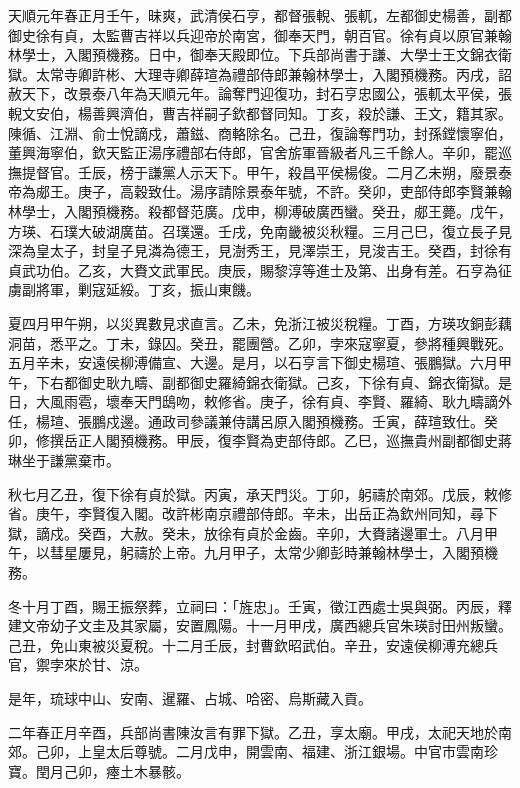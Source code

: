 
\begin{pinyinscope}
天順元年春正月壬午，昧爽，武清侯石亨，都督張輗、張軏，左都御史楊善，副都御史徐有貞，太監曹吉祥以兵迎帝於南宮，御奉天門，朝百官。徐有貞以原官兼翰林學士，入閣預機務。日中，御奉天殿即位。下兵部尚書于謙、大學士王文錦衣衛獄。太常寺卿許彬、大理寺卿薛瑄為禮部侍郎兼翰林學士，入閣預機務。丙戌，詔赦天下，改景泰八年為天順元年。論奪門迎復功，封石亨忠國公，張軏太平侯，張輗文安伯，楊善興濟伯，曹吉祥嗣子欽都督同知。丁亥，殺於謙、王文，籍其家。陳循、江淵、俞士悅謫戍，蕭鎡、商輅除名。己丑，復論奪門功，封孫鏜懷寧伯，董興海寧伯，欽天監正湯序禮部右侍郎，官舍旂軍晉級者凡三千餘人。辛卯，罷巡撫提督官。壬辰，榜于謙黨人示天下。甲午，殺昌平侯楊俊。二月乙未朔，廢景泰帝為郕王。庚子，高穀致仕。湯序請除景泰年號，不許。癸卯，吏部侍郎李賢兼翰林學士，入閣預機務。殺都督范廣。戊申，柳溥破廣西蠻。癸丑，郕王薨。戊午，方瑛、石璞大破湖廣苗。召璞還。壬戌，免南畿被災秋糧。三月己巳，復立長子見深為皇太子，封皇子見潾為德王，見澍秀王，見澤崇王，見浚吉王。癸酉，封徐有貞武功伯。乙亥，大賚文武軍民。庚辰，賜黎淳等進士及第、出身有差。石亨為征虜副將軍，剿寇延綏。丁亥，振山東饑。

夏四月甲午朔，以災異數見求直言。乙未，免浙江被災稅糧。丁酉，方瑛攻銅彭藕洞苗，悉平之。丁未，錄囚。癸丑，罷團營。乙卯，孛來寇寧夏，參將種興戰死。五月辛未，安遠侯柳溥備宣、大邊。是月，以石亨言下御史楊瑄、張鵬獄。六月甲午，下右都御史耿九疇、副都御史羅綺錦衣衛獄。己亥，下徐有貞、錦衣衛獄。是日，大風雨雹，壞奉天門鴟吻，敕修省。庚子，徐有貞、李賢、羅綺、耿九疇謫外任，楊瑄、張鵬戍邊。通政司參議兼侍講呂原入閣預機務。壬寅，薛瑄致仕。癸卯，修撰岳正人閣預機務。甲辰，復李賢為吏部侍郎。乙巳，巡撫貴州副都御史蔣琳坐于謙黨棄市。

秋七月乙丑，復下徐有貞於獄。丙寅，承天門災。丁卯，躬禱於南郊。戊辰，敕修省。庚午，李賢復入閣。改許彬南京禮部侍郎。辛未，出岳正為欽州同知，尋下獄，謫戍。癸酉，大赦。癸未，放徐有貞於金齒。辛卯，大賚諸邊軍士。八月甲午，以彗星屢見，躬禱於上帝。九月甲子，太常少卿彭時兼翰林學士，入閣預機務。

冬十月丁酉，賜王振祭葬，立祠曰：「旌忠」。壬寅，徵江西處士吳與弼。丙辰，釋建文帝幼子文圭及其家屬，安置鳳陽。十一月甲戌，廣西總兵官朱瑛討田州叛蠻。己丑，免山東被災夏稅。十二月壬辰，封曹欽昭武伯。辛丑，安遠侯柳溥充總兵官，禦孛來於甘、涼。

是年，琉球中山、安南、暹羅、占城、哈密、烏斯藏入貢。

二年春正月辛酉，兵部尚書陳汝言有罪下獄。乙丑，享太廟。甲戌，太祀天地於南郊。己卯，上皇太后尊號。二月戊申，開雲南、福建、浙江銀場。中官市雲南珍寶。閏月己卯，瘞土木暴骸。


\end{pinyinscope}
